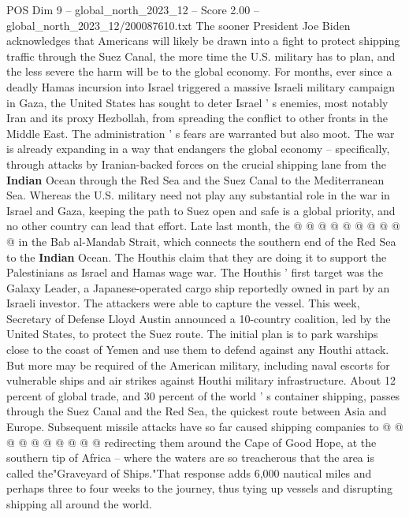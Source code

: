 \begin{textsample}{POS Dim 9 – global\_north\_2023\_12 – Score 2.00 – global\_north\_2023\_12/200087610.txt}  \label{ex:f9_pos_369}
The sooner President Joe Biden acknowledges that Americans will likely be drawn into a fight to protect shipping traffic through the Suez Canal, the more time the U.S. military has to plan, and the less severe the harm will be to the global economy.
For months, ever since a deadly Hamas incursion into Israel triggered a massive Israeli military campaign in Gaza, the United States has sought to deter Israel ' s enemies, most notably Iran and its proxy Hezbollah, from spreading the conflict to other fronts in the Middle East.
The administration ' s fears are warranted but also moot.
The war is already expanding in a way that endangers the global economy -- specifically, through attacks by Iranian-backed forces on the crucial shipping lane from the \textbf{Indian} Ocean through the Red Sea and the Suez Canal to the Mediterranean Sea.
Whereas the U.S. military need not play any substantial role in the war in Israel and Gaza, keeping the path to Suez open and safe is a global priority, and no other country can lead that effort.
Late last month, the @ @ @ @ @ @ @ @ @ @ in the Bab al-Mandab Strait, which connects the southern end of the Red Sea to the \textbf{Indian} Ocean.
The Houthis claim that they are doing it to support the Palestinians as Israel and Hamas wage war.
The Houthis ' first target was the Galaxy Leader, a Japanese-operated cargo ship reportedly owned in part by an Israeli investor.
The attackers were able to capture the vessel.
This week, Secretary of Defense Lloyd Austin announced a 10-country coalition, led by the United States, to protect the Suez route.
The initial plan is to park warships close to the coast of Yemen and use them to defend against any Houthi attack.
But more may be required of the American military, including naval escorts for vulnerable ships and air strikes against Houthi military infrastructure.
About 12 percent of global trade, and 30 percent of the world ' s container shipping, passes through the Suez Canal and the Red Sea, the quickest route between Asia and Europe.
Subsequent missile attacks have so far caused shipping companies to @ @ @ @ @ @ @ @ @ @ redirecting them around the Cape of Good Hope, at the southern tip of Africa -- where the waters are so treacherous that the area is called the"Graveyard of Ships."That response adds 6,000 nautical miles and perhaps three to four weeks to the journey, thus tying up vessels and disrupting shipping all around the world.

\end{textsample}
